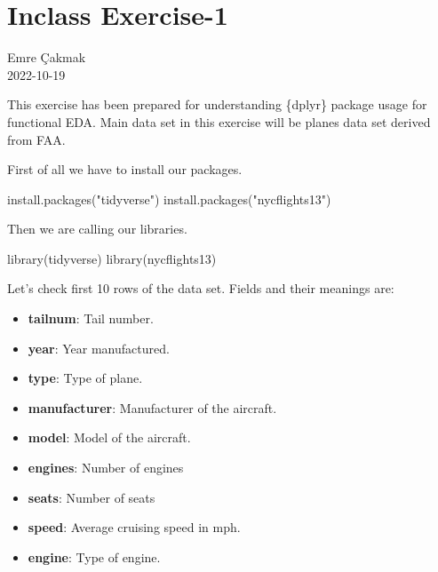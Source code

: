\documentclass[
  letterpaper,
  DIV=11,
  numbers=noendperiod]{scrreprt}
\newenvironment{Shaded}{\begin{snugshade}}{\end{snugshade}}
\newcommand{\FunctionTok}[1]{\textcolor[rgb]{0.28,0.35,0.67}{#1}}
\newcommand{\NormalTok}[1]{\textcolor[rgb]{0.00,0.23,0.31}{#1}}
\newcommand{\StringTok}[1]{\textcolor[rgb]{0.13,0.47,0.30}{#1}}
\providecommand{\tightlist}{%
  \setlength{\itemsep}{0pt}\setlength{\parskip}{0pt}}\usepackage{longtable,booktabs,array}
\begin{document}

\hypertarget{inclass-exercise-1}{%
\chapter{Inclass Exercise-1}\label{inclass-exercise-1}}

Emre Çakmak\\
2022-10-19

\hfill\break

This exercise has been prepared for understanding \{dplyr\} package
usage for functional EDA. Main data set in this exercise will be planes
data set derived from FAA.

First of all we have to install our packages.

\begin{Shaded}
\begin{Highlighting}[]
\FunctionTok{install.packages}\NormalTok{(}\StringTok{"tidyverse"}\NormalTok{)}
\FunctionTok{install.packages}\NormalTok{(}\StringTok{"nycflights13"}\NormalTok{)}
\end{Highlighting}
\end{Shaded}

Then we are calling our libraries.

\begin{Shaded}
\begin{Highlighting}[]
\FunctionTok{library}\NormalTok{(tidyverse)}
\FunctionTok{library}\NormalTok{(nycflights13)}
\end{Highlighting}
\end{Shaded}

Let's check first 10 rows of the data set. Fields and their meanings
are:

\begin{itemize}
\tightlist
\item
  \textbf{tailnum}: Tail number.
\item
  \textbf{year}: Year manufactured.
\item
  \textbf{type}: Type of plane.
\item
  \textbf{manufacturer}: Manufacturer of the aircraft.
\item
  \textbf{model}: Model of the aircraft.
\item
  \textbf{engines}: Number of engines
\item
  \textbf{seats}: Number of seats
\item
  \textbf{speed}: Average cruising speed in mph.
\item
  \textbf{engine}: Type of engine.
\end{itemize}
\end{document}
